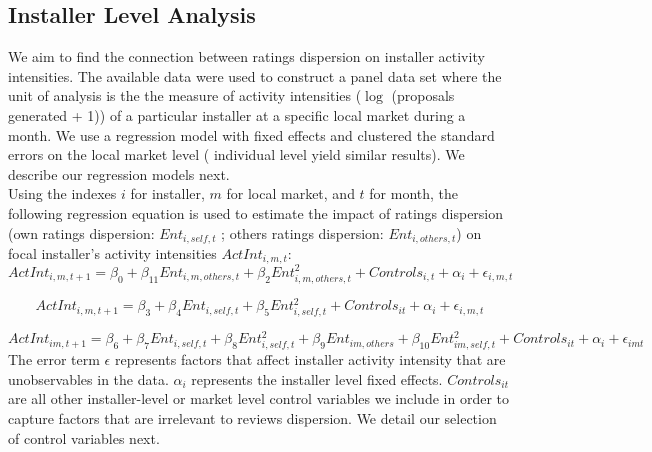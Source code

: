 \documentclass[msom,blindrev]{informs3}
\begin{document}
\subsection{Installer Level Analysis}
We aim to find the connection between ratings dispersion on installer activity intensities. The available data were used to construct a panel data set where the unit of analysis is the the measure of activity intensities ($\log$ (proposals generated + 1)) of a particular installer at a specific local market during a month. We use a regression model with fixed effects and clustered the standard errors on the local market level ( individual level yield similar results). We describe our regression models next. \\
Using the indexes $i$ for installer, $m$ for local market, and $t$ for month, the following regression equation is used to estimate the impact of ratings dispersion (own ratings dispersion: $Ent_{i,self,t}$ ; others ratings dispersion: $Ent_{i,others,t}$) on focal installer's activity intensities $ActInt_{i,m,t}$:
\begin{equation}
    ActInt_{i,m,t+1}=\beta_{0}+\beta_{11} Ent_{i,m,others,t}+\beta_{2}Ent_{i,m,others,t}^2+
   Controls_{i,t}+\alpha_{i}+\epsilon_{i,m,t}
   \label{model_ind_1}
\end{equation}

\begin{equation}
    ActInt_{i,m,t+1}=\beta_{3}+\beta_{4} Ent_{i,self,t}+\beta_{5}Ent_{i,self,t}^2+
   Controls_{it}+\alpha_{i}+\epsilon_{i,m,t}
   \label{model_ind_2}
\end{equation}

\begin{equation}
    ActInt_{im,t+1}=\beta_{6}+\beta_{7}Ent_{i,self,t}+\beta_{8}Ent_{i,self,t}^2+\beta_{9}Ent_{im,others}+\beta_{10}Ent_{im,self,t}^2+Controls_{it}+\alpha_{i}+\epsilon_{imt}
   \label{model_ind_3}
\end{equation}
 The error term $\epsilon$ represents factors that affect installer activity intensity that are unobservables in the data. $\alpha_{i}$ represents the installer level fixed effects. $Controls_{it}$ are all other installer-level or market level control variables we include in order to capture factors that are irrelevant to reviews dispersion. We detail our selection of control variables next.
\end{document}
